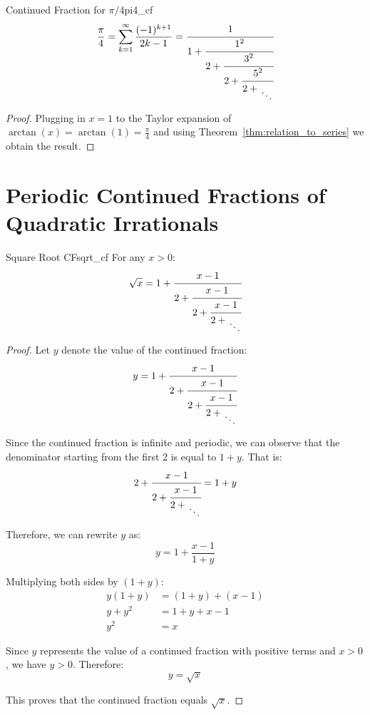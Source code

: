 \documentclass[a4paper]{article}
\begin{document}
\begin{mylemma}{Continued Fraction for \texorpdfstring{$\pi/4$}{pi/4}}{pi4_cf}
  \[
    \frac{\pi}{4} = \sum_{k=1}^{\infty} \frac{(-1)^{k+1}}{2k-1} = \cfrac{1}{1+\cfrac{1^2}{2 +\cfrac{3^2}{2 + \cfrac{5^2}{2 + \CFDots}}}}
  \]

  \begin{proof}
    Plugging in $x=1$ to the Taylor expansion of $\arctan(x)=\arctan(1)=\frac{\pi}{4}$ and using Theorem~\ref{thm:relation_to_series} we obtain the result.
  \end{proof}
\end{mylemma}


\section{Periodic Continued Fractions of Quadratic Irrationals}\label{cf:sec:square-root-numbers}


\begin{mytheorem}{Square Root CF}{sqrt_cf}
  For any $x > 0$:
  \[
    \sqrt{x} = 1 + \cfrac{x-1}{2 +\cfrac{x-1}{2 +\cfrac{x-1}{2 + \CFDots}}}
  \]

  \begin{proof}
    Let $y$ denote the value of the continued fraction:
    \[
      y = 1 + \cfrac{x-1}{2 +\cfrac{x-1}{2 +\cfrac{x-1}{2 + \CFDots}}}
    \]

    Since the continued fraction is infinite and periodic, we can observe that the denominator starting from the first $2$ is equal to $1 + y$. That is:
    \[
      2 +\cfrac{x-1}{2 +\cfrac{x-1}{2 + \CFDots}} = 1 + y
    \]

    Therefore, we can rewrite $y$ as:
    \[
      y = 1 + \frac{x-1}{1+y}
    \]

    Multiplying both sides by $(1+y)$:
    \begin{align*}
      y(1+y)  & = (1+y) + (x-1) \\
      y + y^2 & = 1 + y + x - 1 \\
      y^2     & = x
    \end{align*}

    Since $y$ represents the value of a continued fraction with positive terms and $x > 0$, we have $y > 0$.
    Therefore:
    \[
      y = \sqrt{x}
    \]

    This proves that the continued fraction equals $\sqrt{x}$.
  \end{proof}
\end{mytheorem}
\end{document}
